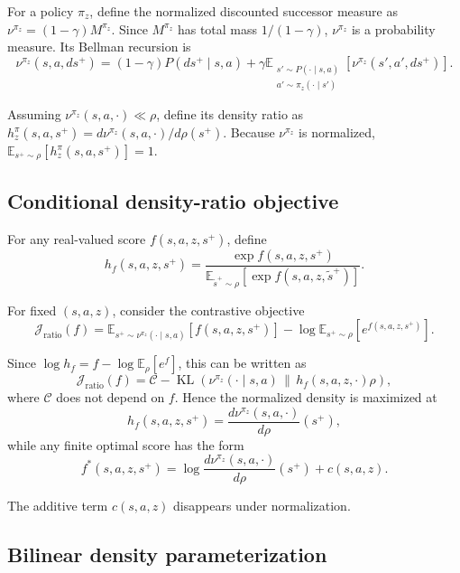 \documentclass[11pt]{article}
\begin{document}
For a policy $\pi_z$, define the normalized discounted successor measure as $\nu^{\pi_z}=(1-\gamma)M^{\pi_z}$. Since $M^{\pi_z}$ has total mass $1/(1-\gamma)$, $\nu^{\pi_z}$ is a probability measure. Its Bellman recursion is
\begin{equation}
    \nu^{\pi_z}(s,a,ds^+) = (1-\gamma)P(ds^+\mid s,a) + \gamma\mathbb E_{\substack{s'\sim P(\cdot\mid s,a)\\a'\sim\pi_z(\cdot\mid s')}}\left[\nu^{\pi_z}(s',a',ds^+)\right].
    \label{eq:nu-bellman}
\end{equation}

Assuming $\nu^{\pi_z}(s,a,\cdot)\ll\rho$, define its density ratio as $h_z^\pi(s,a,s^+)=d\nu^{\pi_z}(s,a,\cdot)/d\rho(s^+)$. Because $\nu^{\pi_z}$ is normalized, $\mathbb E_{s^+\sim\rho}[h_z^\pi(s,a,s^+)]=1$.

\subsection{Conditional density-ratio objective}

For any real-valued score $f(s,a,z,s^+)$, define
\[
    h_f(s,a,z,s^+) = \frac{\exp f(s,a,z,s^+)}{\mathbb E_{\tilde s^+\sim\rho}[\exp f(s,a,z,\tilde s^+)]}.
\]

For fixed $(s,a,z)$, consider the contrastive objective
\[
    \mathcal J_{\mathrm{ratio}}(f) = \mathbb E_{s^+\sim\nu^{\pi_z}(\cdot\mid s,a)}[f(s,a,z,s^+)] - \log\mathbb E_{s^+\sim\rho}[e^{f(s,a,z,s^+)}].
\]

Since $\log h_f=f-\log\mathbb E_\rho[e^f]$, this can be written as
\[
    \mathcal J_{\mathrm{ratio}}(f) = \mathcal C - \operatorname{KL}\left(\nu^{\pi_z}(\cdot\mid s,a)\,\middle\|\,h_f(s,a,z,\cdot)\rho\right),
\]
where $\mathcal C$ does not depend on $f$. Hence the normalized density is maximized at
\[
    h_f(s,a,z,s^+) = \frac{d\nu^{\pi_z}(s,a,\cdot)}{d\rho}(s^+),
\]
while any finite optimal score has the form
\[
    f^*(s,a,z,s^+) = \log\frac{d\nu^{\pi_z}(s,a,\cdot)}{d\rho}(s^+) + c(s,a,z).
\]

The additive term $c(s,a,z)$ disappears under normalization. 

\subsection{Bilinear density parameterization}
\end{document}
